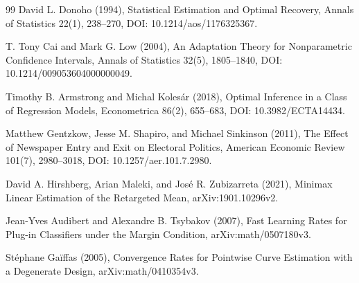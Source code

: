 \documentclass{article}
\begin{document}
\begin{thebibliography}{99}
   David L. Donoho (1994), Statistical Estimation and Optimal Recovery, Annals of Statistics 22(1), 238--270, DOI: 10.1214/aos/1176325367.

   T. Tony Cai and Mark G. Low (2004), An Adaptation Theory for Nonparametric Confidence Intervals, Annals of Statistics 32(5), 1805--1840, DOI: 10.1214/009053604000000049.

   Timothy B. Armstrong and Michal Kolesár (2018), Optimal Inference in a Class of Regression Models, Econometrica 86(2), 655--683, DOI: 10.3982/ECTA14434.

   Matthew Gentzkow, Jesse M. Shapiro, and Michael Sinkinson (2011), The Effect of Newspaper Entry and Exit on Electoral Politics, American Economic Review 101(7), 2980--3018, DOI: 10.1257/aer.101.7.2980.

   David A. Hirshberg, Arian Maleki, and José R. Zubizarreta (2021), Minimax Linear Estimation of the Retargeted Mean, arXiv:1901.10296v2.

   Jean-Yves Audibert and Alexandre B. Tsybakov (2007), Fast Learning Rates for Plug-in Classifiers under the Margin Condition, arXiv:math/0507180v3.

   Stéphane Gaïffas (2005), Convergence Rates for Pointwise Curve Estimation with a Degenerate Design, arXiv:math/0410354v3.

\end{thebibliography}
\end{document}
